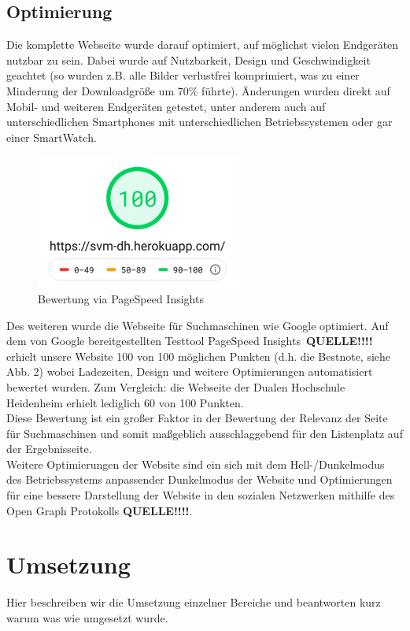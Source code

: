 \documentclass[12pt,a4paper]{article}
\begin{document}
\subsection{Optimierung}
Die komplette Webseite wurde darauf optimiert, auf möglichst vielen Endgeräten nutzbar zu sein. Dabei wurde auf Nutzbarkeit, Design und Geschwindigkeit geachtet (so wurden z.B. alle Bilder verlustfrei komprimiert, was zu einer Minderung der Downloadgröße um 70\% führte). Änderungen wurden direkt auf Mobil- und weiteren Endgeräten getestet, unter anderem auch auf unterschiedlichen Smartphones mit unterschiedlichen Betriebssystemen oder gar einer SmartWatch.
\begin{figure}[!htbp]
\centering
	\includegraphics[scale=1]{Bewertung.png}
	\caption{Bewertung via PageSpeed Insights}
	\label{img:Bewertung}
\end{figure}
Des weiteren wurde die Webseite für Suchmaschinen wie Google optimiert. Auf dem von Google bereitgestellten Testtool \dq PageSpeed Insights\dq \ \textbf{QUELLE!!!!} erhielt unsere Website 100 von 100 möglichen Punkten (d.h. die Bestnote, siehe Abb. 2) wobei Ladezeiten, Design und weitere Optimierungen automatisiert bewertet wurden. Zum Vergleich: die Webseite der Dualen Hochschule Heidenheim erhielt lediglich 60 von 100 Punkten. \\
Diese Bewertung ist ein großer Faktor in der Bewertung der Relevanz der Seite für Suchmaschinen und somit maßgeblich ausschlaggebend für den Listenplatz auf der Ergebnisseite. \\
Weitere Optimierungen der Website sind ein sich mit dem Hell-/Dunkelmodus des Betriebssystems anpassender Dunkelmodus der Website und Optimierungen für eine bessere Darstellung der Website in den sozialen Netzwerken mithilfe des Open Graph Protokolls \textbf{QUELLE!!!!}.

\section{Umsetzung}
Hier beschreiben wir die Umsetzung einzelner Bereiche und beantworten kurz warum was wie umgesetzt wurde.
\end{document}
